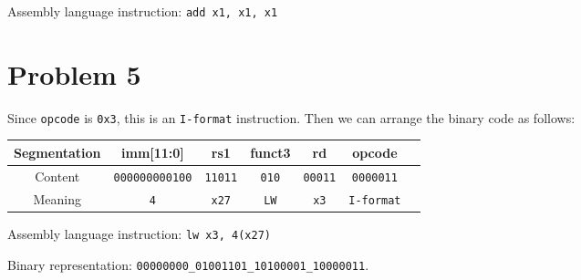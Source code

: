 \documentclass[a4paper,12pt]{article}
\begin{document}
Assembly language instruction: \texttt{add x1, x1, x1}

\section*{Problem 5}

Since \texttt{opcode} is \texttt{0x3}, this is an \texttt{I-format} instruction.
Then we can arrange the binary code as follows:

\begin{center}
	\begin{tabular}{ccccccc}
		\toprule
		Segmentation & imm[11:0] & rs1 & funct3 & rd & opcode \\
		\midrule
		Content & \texttt{000000000100} & \texttt{11011} & \texttt{010} & \texttt{00011} & \texttt{0000011} \\
		Meaning & \texttt{4} & \texttt{x27} & \texttt{LW} & \texttt{x3} & \texttt{I-format} \\
		\bottomrule
	\end{tabular}
\end{center}

Assembly language instruction: \texttt{lw x3, 4(x27)}

Binary representation: \texttt{00000000\_01001101\_10100001\_10000011}.
\end{document}
